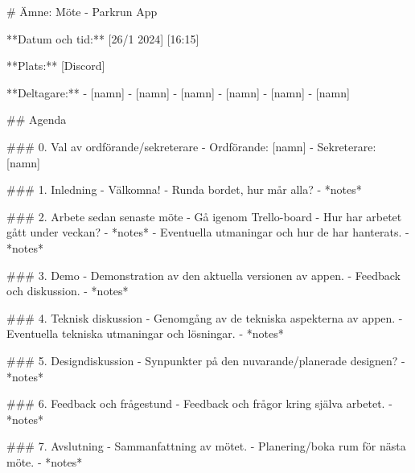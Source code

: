 # Ämne: Möte - Parkrun App

**Datum och tid:** [26/1 2024] [16:15]

**Plats:** [Discord]

**Deltagare:**
- [namn]
- [namn]
- [namn]
- [namn]
- [namn]
- [namn]


## Agenda

### 0. Val av ordförande/sekreterare
- Ordförande: [namn]
- Sekreterare: [namn]

### 1. Inledning
   - Välkomna!
   - Runda bordet, hur mår alla?
     - *notes*

### 2. Arbete sedan senaste möte
   - Gå igenom Trello-board
   - Hur har arbetet gått under veckan?
       - *notes*
   - Eventuella utmaningar och hur de har hanterats.
       - *notes*

### 3. Demo
   - Demonstration av den aktuella versionen av appen.
   - Feedback och diskussion.
       - *notes*

### 4. Teknisk diskussion
   - Genomgång av de tekniska aspekterna av appen.
   - Eventuella tekniska utmaningar och lösningar.
       - *notes*

### 5. Designdiskussion
   - Synpunkter på den nuvarande/planerade designen?
       - *notes*

### 6. Feedback och frågestund
   - Feedback och frågor kring själva arbetet.
       - *notes*

### 7. Avslutning
   - Sammanfattning av mötet.
   - Planering/boka rum för nästa möte.
       - *notes*
